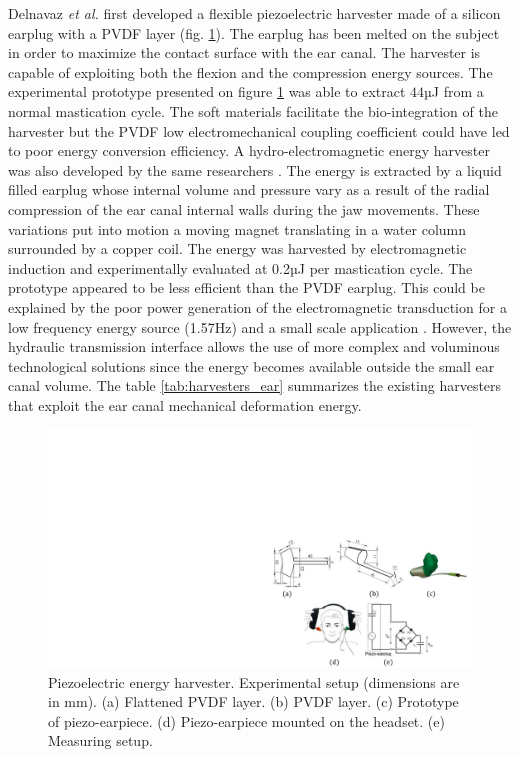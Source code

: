\documentclass[3p,twocolumn,preprint]{elsarticle}
\begin{document}
Delnavaz \emph{et al.} first developed a flexible piezoelectric harvester made of a silicon earplug with a PVDF layer \cite{Delnavaz2013} (fig. \ref{fig:critias_piezo}). The earplug has been melted on the subject in order to maximize the contact surface with the ear canal. The harvester is capable of exploiting both the flexion and the compression energy sources. The experimental prototype presented on figure \ref{fig:critias_piezo} was able to extract $44$µJ from a normal mastication cycle. The soft materials facilitate the bio-integration of the harvester but the PVDF low electromechanical coupling coefficient could have led to poor energy conversion efficiency. A hydro-electromagnetic energy harvester was also developed by the same researchers \cite{Delnavaz2012}. The energy is extracted by a liquid filled earplug whose internal volume and pressure vary as a result of the radial compression of the ear canal internal walls during the jaw movements. These variations put into motion a moving magnet translating in a water column surrounded by a copper coil. The energy was harvested by electromagnetic induction and experimentally evaluated at 0.2µJ per mastication cycle. The prototype appeared to be less efficient than the PVDF earplug. This could be explained by the poor power generation of the electromagnetic transduction for a low frequency energy source (1.57Hz) and a small scale application \cite{Kulah2008,Priya2017}. However, the hydraulic transmission interface allows the use of more complex and voluminous technological solutions since the energy becomes available outside the small ear canal volume. The table \ref{tab:harvesters_ear} summarizes the existing harvesters that exploit the ear canal mechanical deformation energy. \\
\begin{figure}[!htbp]
	\centering
	\captionsetup{justification=centering}
	\includegraphics[trim={18cm 0cm 0cm 8.7cm},clip, width=\linewidth]{figures/critias_piezo.pdf}
	\caption{Piezoelectric energy harvester. Experimental setup (dimensions are in mm). (a) Flattened PVDF layer. (b) PVDF layer. (c) Prototype of piezo-earpiece. (d) Piezo-earpiece mounted on the headset. (e) Measuring setup. \cite{Delnavaz2013}}  
	\label{fig:critias_piezo}
\end{figure}
\end{document}
